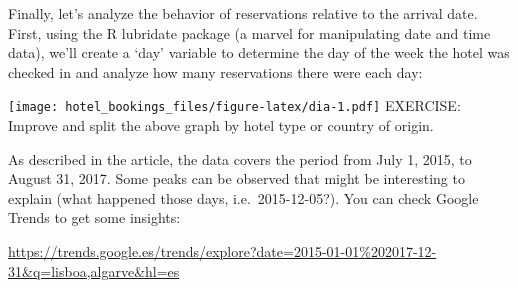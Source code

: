 \documentclass[
]{article}
\newenvironment{Shaded}{\begin{snugshade}}{\end{snugshade}}
\newcommand{\AttributeTok}[1]{\textcolor[rgb]{0.13,0.29,0.53}{#1}}
\newcommand{\CommentTok}[1]{\textcolor[rgb]{0.56,0.35,0.01}{\textit{#1}}}
\newcommand{\FunctionTok}[1]{\textcolor[rgb]{0.13,0.29,0.53}{\textbf{#1}}}
\newcommand{\NormalTok}[1]{#1}
\newcommand{\OtherTok}[1]{\textcolor[rgb]{0.56,0.35,0.01}{#1}}
\newcommand{\SpecialCharTok}[1]{\textcolor[rgb]{0.81,0.36,0.00}{\textbf{#1}}}
\newcommand{\StringTok}[1]{\textcolor[rgb]{0.31,0.60,0.02}{#1}}
\begin{document}
Finally, let's analyze the behavior of reservations relative to the
arrival date. First, using the R lubridate package (a marvel for
manipulating date and time data), we'll create a `day' variable to
determine the day of the week the hotel was checked in and analyze how
many reservations there were each day:

\begin{Shaded}
\end{Shaded}

\texttt{[image: hotel\_bookings\_files/figure-latex/dia-1.pdf]} EXERCISE:
Improve and split the above graph by hotel type or country of origin.

As described in the article, the data covers the period from July 1,
2015, to August 31, 2017. Some peaks can be observed that might be
interesting to explain (what happened those days, i.e.~2015-12-05?). You
can check Google Trends to get some insights:

\url{https://trends.google.es/trends/explore?date=2015-01-01\%202017-12-31&q=lisboa,algarve&hl=es}

\begin{Shaded}
\end{Shaded}
\end{document}
